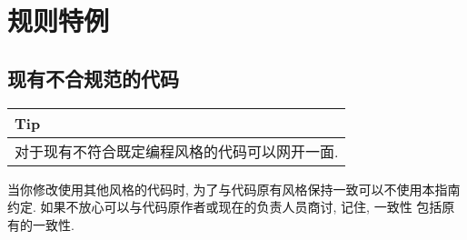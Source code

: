 \documentclass[a4paper,11pt,CJK]{article}
\begin{document}
\begin{CJK}{UTF8}{gbsn}
\begin{enumerate}
\end{enumerate}
\newpage

\section{规则特例}
\subsection{现有不合规范的代码}
\begin{table}[htbp]
\flushleft
\begin{tabular}{p{400pt}}
\toprule
\rowcolor[gray]{.8} Tip \\
\midrule
对于现有不符合既定编程风格的代码可以网开一面.\\
\bottomrule
\end{tabular}
\end{table}
当你修改使用其他风格的代码时, 为了与代码原有风格保持一致可以不使用本指南约定. 如果不放心可以与代码原作者或现在的负责人员商讨, 记住, 一致性 包括原有的一致性.



\end{CJK}
\end{document}
